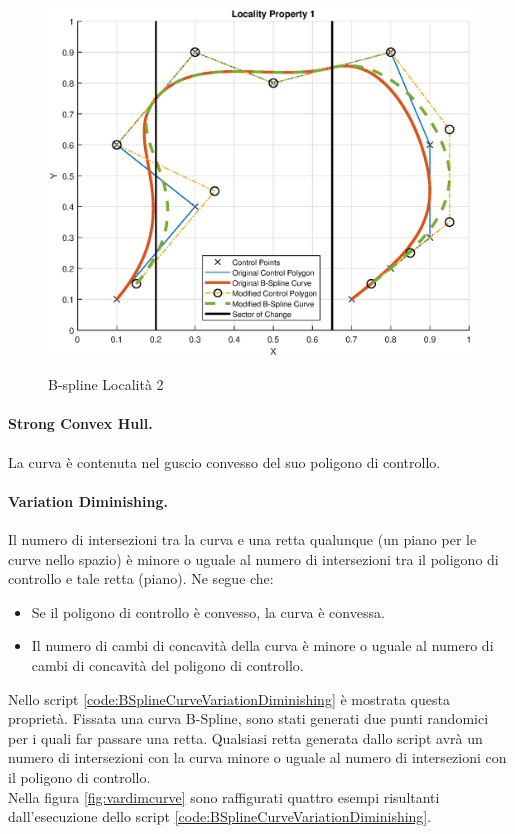 \documentclass[a4paper, 12pt]{article}
\begin{document}
\begin{figure}[!]
	\centering
	\caption{B-spline Località 2}
	\includegraphics[scale=0.7]{locality_2_plot.eps}
	\label{fig:locality2}
\end{figure}

\paragraph{Strong Convex Hull.}
La curva è contenuta nel guscio convesso del suo poligono di controllo.

\paragraph{Variation Diminishing.}
Il numero di intersezioni tra la curva e una retta qualunque (un piano per le curve
nello spazio) è minore o uguale al numero di intersezioni tra il poligono di controllo e tale retta (piano). Ne segue che:
\begin{itemize}
	\item Se il poligono di controllo è convesso, la curva è convessa.
	\item Il numero di cambi di concavità della curva è minore o uguale al numero di
	      cambi di concavità del poligono di controllo.
\end{itemize}

Nello script \ref{code:BSplineCurveVariationDiminishing} è mostrata questa proprietà. Fissata una curva B-Spline, sono stati generati due punti randomici per i quali far passare una retta. Qualsiasi retta generata dallo script avrà un numero di intersezioni con la curva minore o uguale al numero di intersezioni con il poligono di controllo.\\
Nella figura \ref{fig:vardimcurve} sono raffigurati quattro esempi risultanti dall'esecuzione dello script \ref{code:BSplineCurveVariationDiminishing}.
\end{document}
